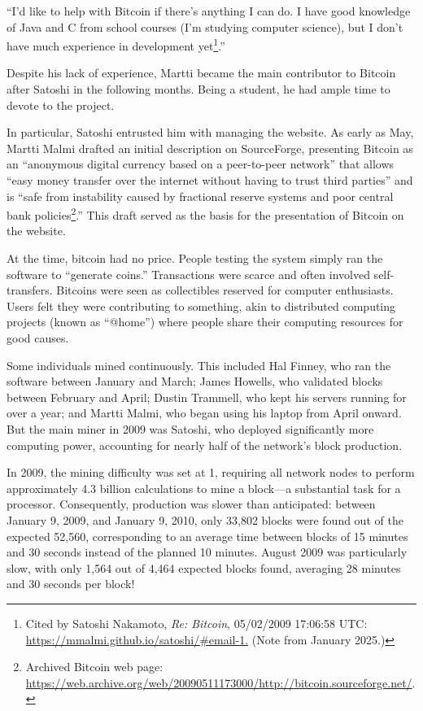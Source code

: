 \documentclass[
  a5paper,
  smalldemyvopaper,10pt,twoside,onecolumn,openright,extrafontsizes,hidelinks]{memoir}
\begin{document}
``I'd like to help with Bitcoin if there's anything I can do. I have
good knowledge of Java and C from school courses (I'm studying computer
science), but I don't have much experience in development
yet\footnote{Cited by Satoshi Nakamoto, \emph{Re: Bitcoin}, 05/02/2009
  17:06:58 UTC: \url{https://mmalmi.github.io/satoshi/\#email-1.} (Note
  from January 2025.)}.''

Despite his lack of experience, Martti became the main contributor to
Bitcoin after Satoshi in the following months. Being a student, he had
ample time to devote to the project.

In particular, Satoshi entrusted him with managing the website. As early
as May, Martti Malmi drafted an initial description on SourceForge,
presenting Bitcoin as an ``anonymous digital currency based on a
peer-to-peer network'' that allows ``easy money transfer over the
internet without having to trust third parties'' and is ``safe from
instability caused by fractional reserve systems and poor central bank
policies\footnote{Archived Bitcoin web page:
  \url{https://web.archive.org/web/20090511173000/http://bitcoin.sourceforge.net/}.}.''
This draft served as the basis for the presentation of Bitcoin on the
website.

At the time, bitcoin had no price. People testing the system simply ran
the software to ``generate coins.'' Transactions were scarce and often
involved self-transfers. Bitcoins were seen as collectibles reserved for
computer enthusiasts. Users felt they were contributing to something,
akin to distributed computing projects (known as ``@home'') where people
share their computing resources for good causes.

Some individuals mined continuously. This included Hal Finney, who ran
the software between January and March; James Howells, who validated
blocks between February and April; Dustin Trammell, who kept his servers
running for over a year; and Martti Malmi, who began using his laptop
from April onward. But the main miner in 2009 was Satoshi, who deployed
significantly more computing power, accounting for nearly half of the
network's block production.

In 2009, the mining difficulty was set at 1, requiring all network nodes
to perform approximately 4.3 billion calculations to mine a block---a
substantial task for a processor. Consequently, production was slower
than anticipated: between January 9, 2009, and January 9, 2010, only
33,802 blocks were found out of the expected 52,560, corresponding to an
average time between blocks of 15 minutes and 30 seconds instead of the
planned 10 minutes. August 2009 was particularly slow, with only 1,564
out of 4,464 expected blocks found, averaging 28 minutes and 30 seconds
per block!
\end{document}

